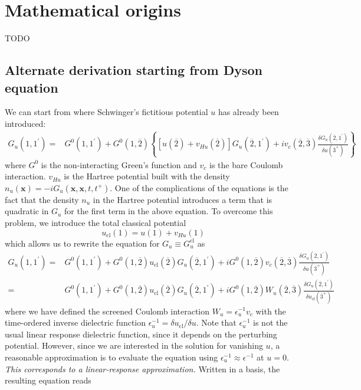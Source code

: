 \section{Mathematical origins}
TODO
\subsection{Alternate derivation starting from Dyson equation}
We can start from where Schwinger's fictitious potential $u$ has already been introduced:
\begin{align}
G_{u}\left(1,1^{\prime}\right)= & G^{0}\left(1,1^{\prime}\right)+G^{0}(1, \overline{2}) \left\{\left[u(\overline{2})+v_{H u}(\overline{2})\right] G_{u}\left(\overline{2}, 1^{\prime}\right)+i v_{c}(\overline{2}, \overline{3}) \frac{\delta G_{u}\left(\overline{2}, 1^{\prime}\right)}{\delta u\left(\overline{3}^{+}\right)}\right\} 
\end{align}
where $G^{0}$ is the non-interacting Green's function and $v_{c}$ is the bare Coulomb interaction. $v_{H u}$ is the Hartree potential built with the density $n_{u}(\mathbf{x})=-i G_{u}\left(\mathbf{x}, \mathbf{x}, t, t^{+}\right)$. One of the complications of the equations is the fact that the density $n_{u}$ in the Hartree potential introduces a term that is quadratic in $G_{u}$ for the first term in the above equation. To overcome this problem, we introduce the total classical potential
\begin{equation}
u_{\mathrm{cl}}(1)=u(1)+v_{H u}(1)
\end{equation}
which allows us to rewrite the equation for $G_{u}\equiv G_u^{\mathrm{cl}}$ as
\begin{align}
G_{u}\left(1,1^{\prime}\right)= & G^{0}\left(1,1^{\prime}\right)+G^{0}(1, \overline{2}) u_{\mathrm{cl}}(\overline{2}) G_{u}\left(\overline{2}, 1^{\prime}\right) +i G^{0}(1, \overline{2}) v_{c}(\overline{2}, \overline{3}) \frac{\delta G_{u}\left(\overline{2}, 1^{\prime}\right)}{\delta u\left(\overline{3}^{+}\right)} \\
= & G^{0}\left(1,1^{\prime}\right)+G^{0}(1, \overline{2}) u_{\mathrm{cl}}(\overline{2}) G_{u}\left(\overline{2}, 1^{\prime}\right) +i G^{0}(1, \overline{2}) W_{u}(\overline{2}, \overline{3}) \frac{\delta G_{u}\left(\overline{2}, 1^{\prime}\right)}{\delta u_{\mathrm{cl}}\left(\overline{3}^{+}\right)}
\end{align}
where we have defined the screened Coulomb interaction $W_{u} =\epsilon_{u}^{-1} v_{c}$ with the time-ordered inverse dielectric function $\epsilon_{u}^{-1} =\delta u_{\mathrm{cl}} / \delta u$. Note that $\epsilon_{u}^{-1}$ is not the usual linear response dielectric function, since it depends on the perturbing potential. However, since we are interested in the solution for vanishing $u$, a reasonable approximation is to evaluate the equation using $\epsilon_{u}^{-1} \approx \epsilon^{-1}$ at $u=0$. \emph{This corresponds to a linear-response approximation.} Written in a basis, the resulting equation reads
